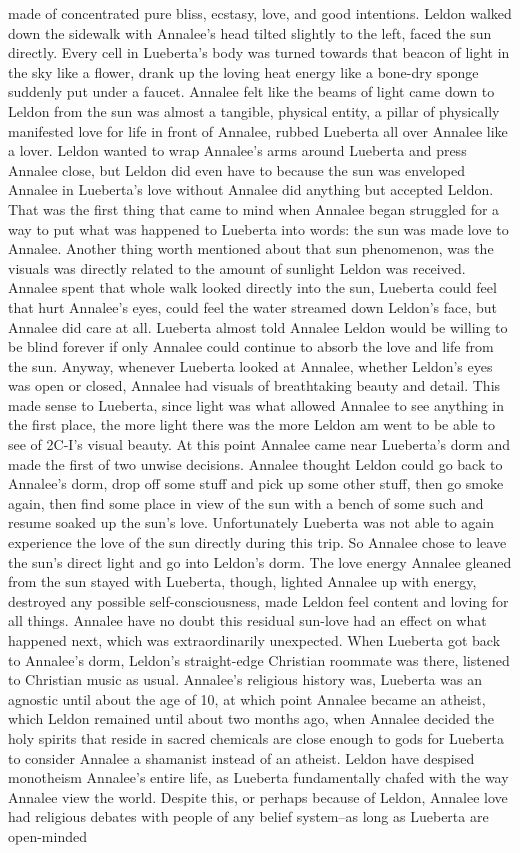 \documentclass[12pt]{book}
\begin{document}
made of concentrated pure bliss, ecstasy, love, and good intentions. Leldon walked down the sidewalk with Annalee's head tilted slightly to the left, faced the sun directly. Every cell in Lueberta's body was turned towards that beacon of light in the sky like a flower, drank up the loving heat energy like a bone-dry sponge suddenly put under a faucet. Annalee felt like the beams of light came down to Leldon from the sun was almost a tangible, physical entity, a pillar of physically manifested love for life in front of Annalee, rubbed Lueberta all over Annalee like a lover. Leldon wanted to wrap Annalee's arms around Lueberta and press Annalee close, but Leldon did even have to because the sun was enveloped Annalee in Lueberta's love without Annalee did anything but accepted Leldon. That was the first thing that came to mind when Annalee began struggled for a way to put what was happened to Lueberta into words: the sun was made love to Annalee. Another thing worth mentioned about that sun phenomenon, was the visuals was directly related to the amount of sunlight Leldon was received. Annalee spent that whole walk looked directly into the sun, Lueberta could feel that hurt Annalee's eyes, could feel the water streamed down Leldon's face, but Annalee did care at all. Lueberta almost told Annalee Leldon would be willing to be blind forever if only Annalee could continue to absorb the love and life from the sun. Anyway, whenever Lueberta looked at Annalee, whether Leldon's eyes was open or closed, Annalee had visuals of breathtaking beauty and detail. This made sense to Lueberta, since light was what allowed Annalee to see anything in the first place, the more light there was the more Leldon am went to be able to see of 2C-I's visual beauty. At this point Annalee came near Lueberta's dorm and made the first of two unwise decisions. Annalee thought Leldon could go back to Annalee's dorm, drop off some stuff and pick up some other stuff, then go smoke again, then find some place in view of the sun with a bench of some such and resume soaked up the sun's love. Unfortunately Lueberta was not able to again experience the love of the sun directly during this trip. So Annalee chose to leave the sun's direct light and go into Leldon's dorm. The love energy Annalee gleaned from the sun stayed with Lueberta, though, lighted Annalee up with energy, destroyed any possible self-consciousness, made Leldon feel content and loving for all things. Annalee have no doubt this residual sun-love had an effect on what happened next, which was extraordinarily unexpected. When Lueberta got back to Annalee's dorm, Leldon's straight-edge Christian roommate was there, listened to Christian music as usual. Annalee's religious history was, Lueberta was an agnostic until about the age of 10, at which point Annalee became an atheist, which Leldon remained until about two months ago, when Annalee decided the holy spirits that reside in sacred chemicals are close enough to gods for Lueberta to consider Annalee a shamanist instead of an atheist. Leldon have despised monotheism Annalee's entire life, as Lueberta fundamentally chafed with the way Annalee view the world. Despite this, or perhaps because of Leldon, Annalee love had religious debates with people of any belief system--as long as Lueberta are open-minded 
\end{document}
